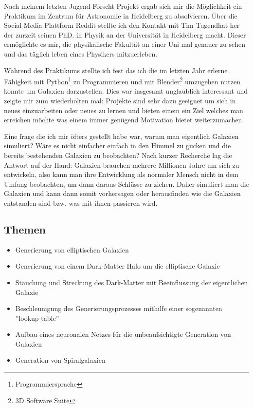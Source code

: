 Nach meinem letzten Jugend-Forscht Projekt ergab sich mir die Möglichkeit ein
Praktikum im Zentrum für Astronomie in Heidelberg zu absolvieren. Über die
Social-Media Plattform Reddit stellte ich den Kontakt mit Tim Tugendhat her
der zurzeit seinen PhD. in Physik an der Universität in Heidelberg macht.
Dieser ermöglichte es mir, die physikalische Fakultät an einer Uni mal genauer
zu sehen und das täglich leben eines Physikers mitzuerleben.
\par
Während des Praktikums stellte ich fest das ich die im letzten Jahr erlerne Fähigkeit mit
Python\footnote{Programmiersprache} zu Programmieren und mit
Blender\footnote{3D Software Suite} umzugehen nutzen konnte um Galaxien
darzustellen.
Dies war insgesamt unglaublich interessant und zeigte mir zum wiederholten mal:
Projekte sind sehr dazu geeignet um sich in neues einzuarbeiten oder neues
zu lernen und bieten einem ein Ziel welches man erreichen möchte was einem
immer genügend Motivation bietet weiterzumachen.
\par
Eine frage die ich mir öfters gestellt habe war, warum man eigentlich Galaxien
simuliert? Wäre es nicht einfacher einfach in den Himmel zu gucken und
die bereits bestehenden Galaxien zu beobachten?
Nach kurzer Recherche lag die Antwort auf der Hand: Galaxien brauchen mehrere
Millionen Jahre um sich zu entwickeln, also kann man ihre Entwicklung als
normaler Mensch nicht in dem Umfang beobachten, um dann daraus Schlüsse zu
ziehen. Daher simuliert man die Galaxien und kann dann somit vorhersagen oder
herausfinden wie die Galaxien entstanden sind bzw. was mit ihnen passieren
wird.

\subsection{Themen}

\begin{itemize}
  \item Generierung von elliptischen Galaxien
  \item Generierung von einem Dark-Matter Halo um die elliptische Galaxie
  \item Stauchung und Streckung des Dark-Matter mit Beeinflussung der eigentlichen Galaxie
  \item Beschleunigung des Generierungsprozesses mithilfe einer sogenannten ''lookup-table''
  \item Aufbau eines neuronalen Netzes für die unbeaufsichtigte Generation von Galaxien
  \item Generation von Spiralgalaxien
\end{itemize}

